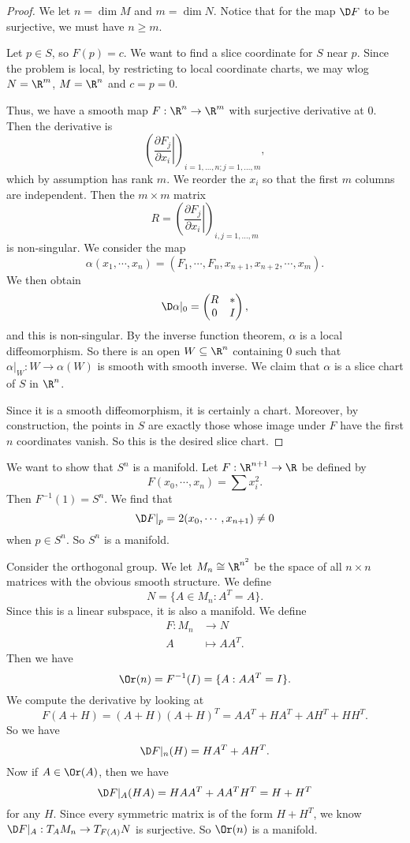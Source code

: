 \documentclass[a4paper]{article}
\begin{document}
\begin{proof}
  We let $n = \dim M$ and $m = \dim N$. Notice that for the map $\D F$ to be surjective, we must have $n \geq m$.

  Let $p \in S$, so $F(p) = c$. We want to find a slice coordinate for $S$ near $p$. Since the problem is local, by restricting to local coordinate charts, we may wlog $N = \R^m$, $M = \R^n$ and $c = p = 0$.

  Thus, we have a smooth map $F: \R^n \to \R^m$ with surjective derivative at $0$. Then the derivative is
  \[
    \left(\left.\frac{\partial F_j}{\partial x_i}\right|\right)_{i = 1, \ldots, n; j = 1, \ldots, m},
  \]
  which by assumption has rank $m$. We reorder the $x_i$ so that the first $m$ columns are independent. Then the $m \times m$ matrix
  \[
    R = \left(\left.\frac{\partial F_j}{\partial x_i}\right|\right)_{i,j = 1, \ldots, m}
  \]
  is non-singular. We consider the map
  \[
    \alpha(x_1, \cdots, x_n) = (F_1, \cdots, F_n, x_{n + 1}, x_{n + 2}, \cdots, x_m).
  \]
  We then obtain
  \[
    \D \alpha|_0 =
    \begin{pmatrix}
      R & * \\
      0 & I
    \end{pmatrix},
  \]
  and this is non-singular. By the inverse function theorem, $\alpha$ is a local diffeomorphism. So there is an open $W\subseteq \R^n$ containing $0$ such that $\alpha|_W: W \to \alpha(W)$ is smooth with smooth inverse. We claim that $\alpha$ is a slice chart of $S$ in $\R^n$.

  Since it is a smooth diffeomorphism, it is certainly a chart. Moreover, by construction, the points in $S$ are exactly those whose image under $F$ have the first $n$ coordinates vanish. So this is the desired slice chart.
\end{proof}

\begin{eg}
  We want to show that $S^n$ is a manifold. Let $F: \R^{n + 1} \to \R$ be defined by
  \[
    F(x_0, \cdots, x_n) = \sum x_i^2.
  \]
  Then $F^{-1}(1) = S^n$. We find that
  \[
    \D F|_p = 2(x_0, \cdots, x_{n + 1}) \not= 0
  \]
  when $p \in S^n$. So $S^n$ is a manifold.
\end{eg}

\begin{eg}
  Consider the orthogonal group. We let $M_n \cong \R^{n^2}$ be the space of all $n \times n$ matrices with the obvious smooth structure. We define
  \[
    N = \{A \in M_n: A^T = A\}.
  \]
  Since this is a linear subspace, it is also a manifold. We define
  \begin{align*}
    F: M_n &\to N\\
    A &\mapsto AA^T.
  \end{align*}
  Then we have
  \[
    \Or(n) = F^{-1}(I) = \{A: AA^T = I\}.
  \]
  We compute the derivative by looking at
  \[
    F (A + H) = (A + H)(A + H)^T = AA^T + HA^T + AH^T + HH^T.
  \]
  So we have
  \[
    \D F|_n (H) = HA^T + AH^T.
  \]
  Now if $A \in \Or(A)$, then we have
  \[
    \D F|_A (HA) = HAA^T + AA^T H^T = H + H^T
  \]
  for any $H$. Since every symmetric matrix is of the form $H + H^T$, we know $\D F|_A: T_A M_n \to T_{F(A)}N$ is surjective. So $\Or(n)$ is a manifold.
\end{eg}
\end{document}

